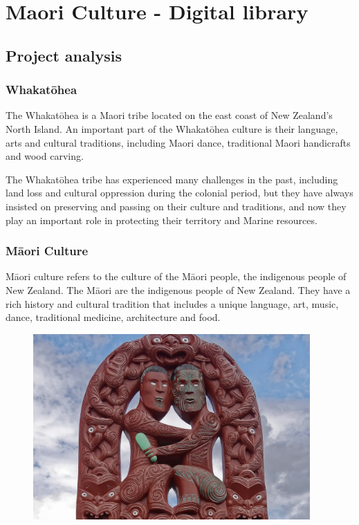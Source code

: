\chapter{Maori Culture - Digital library}

\section{Project analysis}
\subsection{Whakatōhea}
The Whakatōhea is a Maori tribe located on the east coast of New Zealand's North Island. An important part of the Whakatōhea culture is their language, arts and cultural traditions, including Maori dance, traditional Maori handicrafts and wood carving\cite{AboutUsW41:online}.

The Whakatōhea tribe has experienced many challenges in the past, including land loss and cultural oppression during the colonial period, but they have always insisted on preserving and passing on their culture and traditions, and now they play an important role in protecting their territory and Marine resources\cite{AboutUsW41:online}.

\subsection{Māori Culture}
Māori culture refers to the culture of the Māori people, the indigenous people of New Zealand. The Māori are the indigenous people of New Zealand. They have a rich history and cultural tradition that includes a unique language, art, music, dance, traditional medicine, architecture and food.

\begin{figure}[htbp]
  \centerline{\includegraphics[width=300pt]{images/M1-1.png}}
\end{figure}

